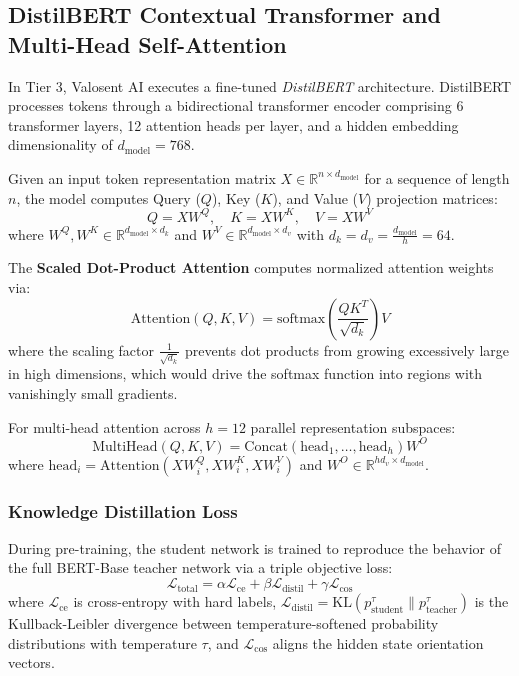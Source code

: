 \subsection{DistilBERT Contextual Transformer and Multi-Head Self-Attention}
In Tier 3, Valosent AI executes a fine-tuned \textit{DistilBERT} architecture. DistilBERT processes tokens through a bidirectional transformer encoder comprising 6 transformer layers, 12 attention heads per layer, and a hidden embedding dimensionality of $d_{\text{model}} = 768$.

Given an input token representation matrix $X \in \mathbb{R}^{n \times d_{\text{model}}}$ for a sequence of length $n$, the model computes Query ($Q$), Key ($K$), and Value ($V$) projection matrices:
\begin{equation}
    Q = X W^Q, \quad K = X W^K, \quad V = X W^V
\end{equation}
where $W^Q, W^K \in \mathbb{R}^{d_{\text{model}} \times d_k}$ and $W^V \in \mathbb{R}^{d_{\text{model}} \times d_v}$ with $d_k = d_v = \frac{d_{\text{model}}}{h} = 64$.

The \textbf{Scaled Dot-Product Attention} computes normalized attention weights via:
\begin{equation}
    \text{Attention}(Q, K, V) = \text{softmax}\left( \frac{Q K^T}{\sqrt{d_k}} \right) V
    \label{eq:self_attention}
\end{equation}
where the scaling factor $\frac{1}{\sqrt{d_k}}$ prevents dot products from growing excessively large in high dimensions, which would drive the softmax function into regions with vanishingly small gradients.

For multi-head attention across $h = 12$ parallel representation subspaces:
\begin{equation}
    \text{MultiHead}(Q, K, V) = \text{Concat}(\text{head}_1, \dots, \text{head}_h) W^O
\end{equation}
where $\text{head}_i = \text{Attention}(X W_i^Q, X W_i^K, X W_i^V)$ and $W^O \in \mathbb{R}^{h d_v \times d_{\text{model}}}$.

\subsubsection{Knowledge Distillation Loss}
During pre-training, the student network is trained to reproduce the behavior of the full BERT-Base teacher network via a triple objective loss:
\begin{equation}
    \mathcal{L}_{\text{total}} = \alpha \mathcal{L}_{\text{ce}} + \beta \mathcal{L}_{\text{distil}} + \gamma \mathcal{L}_{\text{cos}}
    \label{eq:distil_loss}
\end{equation}
where $\mathcal{L}_{\text{ce}}$ is cross-entropy with hard labels, $\mathcal{L}_{\text{distil}} = \text{KL}(p_{\text{student}}^{\tau} \parallel p_{\text{teacher}}^{\tau})$ is the Kullback-Leibler divergence between temperature-softened probability distributions with temperature $\tau$, and $\mathcal{L}_{\text{cos}}$ aligns the hidden state orientation vectors.

